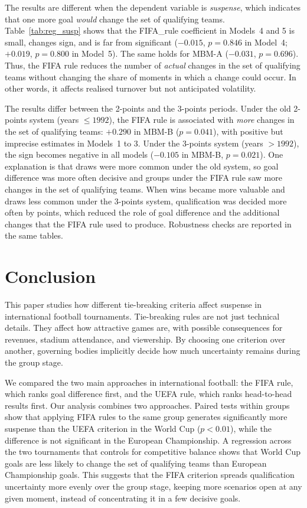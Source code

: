 \documentclass[11pt]{article}
\begin{document}
The results are different when the dependent variable is \textit{suspense}, which indicates that one more goal \textit{would} change the set of qualifying teams. Table~\ref{tab:reg_susp} shows that the FIFA\_rule coefficient in Models~4 and 5 is small, changes sign, and is far from significant ($-0.015$, $p = 0.846$ in Model~4; $+0.019$, $p = 0.800$ in Model~5). The same holds for MBM-A ($-0.031$, $p = 0.696$). Thus, the FIFA rule reduces the number of \textit{actual} changes in the set of qualifying teams without changing the share of moments in which a change could occur. In other words, it affects realised turnover but not anticipated volatility.

The results differ between the 2-points and the 3-points periods. Under the old 2-points system (years $\le 1992$), the FIFA rule is associated with \textit{more} changes in the set of qualifying teams: $+0.290$ in MBM-B ($p = 0.041$), with positive but imprecise estimates in Models~1 to 3. Under the 3-points system (years $> 1992$), the sign becomes negative in all models ($-0.105$ in MBM-B, $p = 0.021$). One explanation is that draws were more common under the old system, so goal difference was more often decisive and groups under the FIFA rule saw more changes in the set of qualifying teams. When wins became more valuable and draws less common under the 3-points system, qualification was decided more often by points, which reduced the role of goal difference and the additional changes that the FIFA rule used to produce. Robustness checks are reported in the same tables.






\section{Conclusion}
\label{sec:conclusion}

This paper studies how different tie-breaking criteria affect suspense in international football tournaments. Tie-breaking rules are not just technical details. They affect how attractive games are, with possible consequences for revenues, stadium attendance, and viewership. By choosing one criterion over another, governing bodies implicitly decide how much uncertainty remains during the group stage.

We compared the two main approaches in international football: the FIFA rule, which ranks goal difference first, and the UEFA rule, which ranks head-to-head results first. Our analysis combines two approaches. Paired tests within groups show that applying FIFA rules to the same group generates significantly more suspense than the UEFA criterion in the World Cup ($p < 0.01$), while the difference is not significant in the European Championship. A regression across the two tournaments that controls for competitive balance shows that World Cup goals are less likely to change the set of qualifying teams than European Championship goals. This suggests that the FIFA criterion spreads qualification uncertainty more evenly over the group stage, keeping more scenarios open at any given moment, instead of concentrating it in a few decisive goals.
\end{document}

